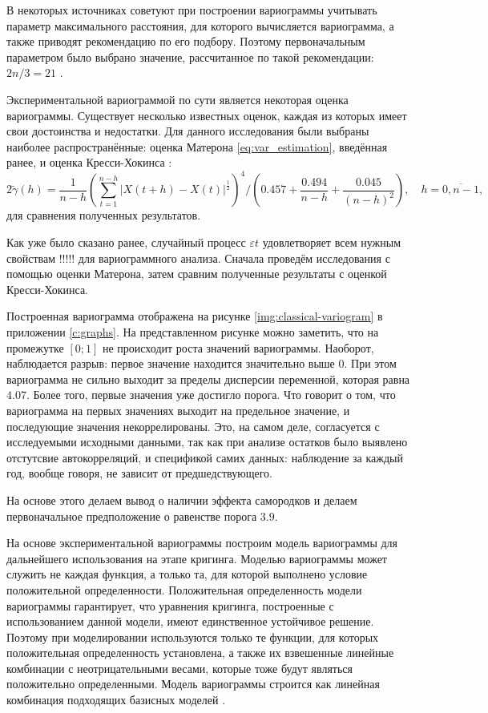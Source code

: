 В некоторых источниках советуют при построении вариограммы учитывать параметр максимального расстояния, для которого вычисляется вариограмма, а также приводят рекомендацию по его подбору. Поэтому первоначальным параметром было выбрано значение, рассчитанное по такой рекомендации: $ 2n / 3 = 21 $ \cite{cressie2011statistics}.

Экспериментальной вариограммой по сути является некоторая оценка вариограммы. Существует несколько известных оценок, каждая из которых имеет свои достоинства и недостатки. Для данного исследования были выбраны наиболее распространённые: оценка Матерона \eqref{eq:var_estimation}, введённая ранее, и оценка Кресси-Хокинса \cite{dutter, cressie1993statistics}:
\begin{equation*}
	2 \tilde{\gamma}(h) = \frac{1}{n - h} (\sum_{t = 1}^{n - h} | X(t + h) - X(t) |^{\frac{1}{2}} )^4 / (0.457 + \frac{0.494}{n - h} + \frac{0.045}{(n - h)^2}), \quad h = \overline{0, n - 1},
\end{equation*}
для сравнения полученных результатов.

Как уже было сказано ранее, случайный процесс $ \varepsilon{t} $ удовлетворяет всем нужным свойствам !!!!! для вариограммного анализа. Сначала проведём исследования с помощью оценки Матерона, затем сравним полученные результаты с
оценкой Кресси-Хокинса.

Построенная вариограмма отображена на рисунке \ref{img:classical-variogram} в приложении \ref{c:graphs}. На представленном рисунке можно заметить, что на промежутке $[0;1]$ не происходит роста значений вариограммы. Наоборот, наблюдается разрыв: первое значение находится значительно выше $0$. При этом вариограмма не сильно выходит за пределы дисперсии переменной, которая равна $4.07$. Более того, первые значения уже достигло порога. Что говорит о том, что вариограмма на первых значениях выходит на предельное значение, и последующие значения некоррелированы. Это, на самом деле, согласуется с исследуемыми исходными данными, так как при анализе остатков было выявлено отстутсвие автокорреляций, и спецификой самих данных: наблюдение за каждый год, вообще говоря, не зависит от предшедствующего.

На основе этого делаем вывод о наличии эффекта самородков и делаем первоначальное предположение о равенстве порога $3.9$.

На основе экспериментальной вариограммы построим модель вариограммы для дальнейшего использования на этапе кригинга. Моделью вариограммы может служить не каждая функция, а только та, для которой выполнено условие положительной определенности. Положительная определенность модели вариограммы гарантирует, что уравнения кригинга, построенные с использованием данной модели, имеют единственное устойчивое решение. Поэтому при моделировании используются только те функции, для которых положительная определенность установлена, а также их взвешенные линейные комбинации с неотрицательными весами, которые тоже будут являться положительно определенными. Модель вариограммы строится как линейная комбинация подходящих базисных моделей \cite{saveliev2012}.


